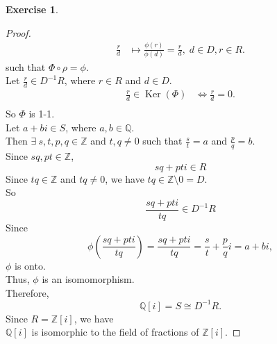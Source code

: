 \documentclass{article}
\newcommand{\bbz}{\mathbb{Z}}
\newcommand{\bbq}{\mathbb{Q}}
\renewcommand{\ker}{\operatorname{Ker}}
\theoremstyle{plain}
\theoremstyle{definition}
\newtheorem{exer}[lem]{Exercise}
\begin{document}
\begin{exer}
\begin{proof}
\begin{align*}
       \frac{r}{d} &\mapsto \frac{\phi(r)}{\phi(d)}=\frac{r}{d},\; d \in D,r \in R.
   \end{align*}
   such that $\Phi\circ \rho = \phi$.\\
   Let $\frac{r}{d} \in D^{-1}R$, where $r \in R$ and $d\in D$. 
   \begin{align*}
       \frac{r}{d} \in \ker(\Phi)&\Longleftrightarrow \frac{r}{d} = 0. \\
   \end{align*}
   So $\Phi$ is 1-1.\\
   Let $a+bi \in S$, where $a,b\in \bbq$.\\
   Then $\exists \ s,t,p,q \in \bbz$ and $t,q\neq 0$ such that $\frac{s}{t} = a$ and $\frac{p}{q} = b$.\\
Since $sq,pt \in \bbz$, 
\[sq+pt i \in R\]
Since $tq \in \bbz$ and $tq \neq 0$, we have $tq \in \bbz\setminus 0 = D$.\\
So 
\[\frac{sq+pti}{tq} \in D^{-1}R\]
Since
   \[\phi\left(\frac{sq+pti}{tq}\right) = \frac{sq+pti}{tq} = \frac{s}{t}+\frac{p}{q}i = a+bi,\]
   $\phi$ is onto.\\
   Thus, $\phi$ is an isomomorphism.\\
   Therefore, \[\bbq[i]= S \cong D^{-1}R.\]
   Since $R = \bbz[i]$, we have\\
   $\bbq[i]$ is isomorphic to the field of fractions of $\bbz[i]$.
\end{proof}

\end{exer}
\end{document}
